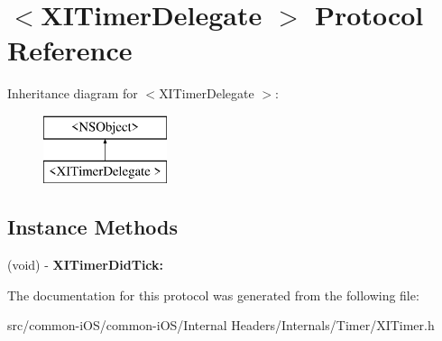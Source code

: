 \hypertarget{protocol_x_i_timer_delegate_01-p}{}\section{$<$X\+I\+Timer\+Delegate $>$ Protocol Reference}
\label{protocol_x_i_timer_delegate_01-p}
Inheritance diagram for $<$X\+I\+Timer\+Delegate $>$\+:\begin{figure}[H]
\begin{center}
\leavevmode
\includegraphics[height=2.000000cm]{protocol_x_i_timer_delegate_01-p}
\end{center}
\end{figure}
\subsection*{Instance Methods}
\begin{DoxyCompactItemize}
\item 
\hypertarget{protocol_x_i_timer_delegate_01-p_adb5bb983fef396441ade919635c10b95}{}\label{protocol_x_i_timer_delegate_01-p_adb5bb983fef396441ade919635c10b95} 
(void) -\/ {\bfseries X\+I\+Timer\+Did\+Tick\+:}
\end{DoxyCompactItemize}


The documentation for this protocol was generated from the following file\+:\begin{DoxyCompactItemize}
\item 
src/common-\/i\+O\+S/common-\/i\+O\+S/\+Internal Headers/\+Internals/\+Timer/X\+I\+Timer.\+h\end{DoxyCompactItemize}
